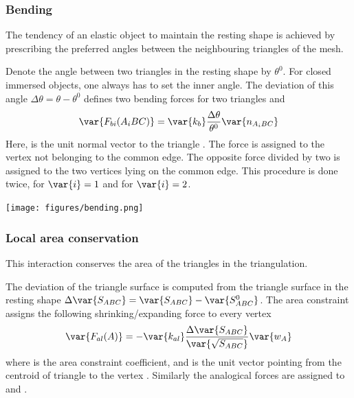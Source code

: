 \subsubsection*{Bending}
The tendency of an elastic object to maintain the resting shape is achieved by 
prescribing the preferred angles between the neighbouring triangles of the mesh. 

Denote the angle between two triangles in the resting shape by $\theta^0$. For 
closed immersed objects, one always has to set the inner angle. The deviation 
of this angle $\Delta \theta = \theta - \theta^0$ defines two 
bending forces for two triangles  and 
\begin{equation}
\var{F_{bi}(A_iBC)} = \var{k_b}\frac{\Delta \theta}{\theta^0} \var{n_{A_iBC}}
\end{equation}
Here,  is the unit normal vector to the triangle . The 
force  is assigned to the vertex not belonging to the common 
edge. The opposite force divided by two is assigned to the two vertices lying on 
the common edge. This procedure is done twice, for $\var{i}=1$ and for 
$\var{i}=2$.

\begin{center}
  \texttt{[image: figures/bending.png]}
\end{center}



\subsubsection*{Local area conservation}
This interaction conserves the area of the triangles in the triangulation. 

The deviation of the triangle surface  is computed from the triangle 
surface in the resting shape $\Delta \var{S_{ABC}} = \var{S_{ABC}} - \var{S_{ABC}^0}$. 
The area constraint assigns the following shrinking/expanding force to every vertex 
\begin{equation}
 \var{F_{al}(A)} = -\var{k_{al}}\frac{\Delta \var{S_{ABC}}}{\var{\sqrt{S_{ABC}}}}\var{w_{A}}
\end{equation}
where   is the area constraint coefficient, and  is the unit 
vector pointing from the centroid of triangle  to the vertex . 
Similarly the analogical forces are assigned to  and . 

